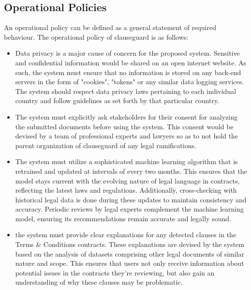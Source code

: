 \subsection{Operational Policies}
An operational policy can be defined as a general statement of required behaviour. The operational policy of clauseguard is as follows: 
\begin{itemize}
    \item Data privacy is a major cause of concern for the proposed system. Sensitive and confidential information would be shared on an open internet website. As such, the system must ensure that no information is stored on any back-end servers in the form of "cookies", "tokens" or any similar data logging services. The system should respect data privacy laws pertaining to each individual country and follow guidelines as set forth by that particular country. 
    
    \item The system must explicitly ask stakeholders for their consent for analyzing the submitted documents before using the system. This consent would be devised by a team of professional experts and lawyers so as to not hold the parent organization of clauseguard of any legal ramifications. 

    \item The system must utilize a sophisticated machine learning algorithm that is retrained and updated at intervals of every two months. This ensures that the model stays current with the evolving nature of legal language in contracts, reflecting the latest laws and regulations. Additionally, cross-checking with historical legal data is done during these updates to maintain consistency and accuracy. Periodic reviews by legal experts complement the machine learning model, ensuring its recommendations remain accurate and legally sound.

    \item the system must provide clear explanations for any detected clauses in the Terms & Conditions contracts. These explanations are devised by the system based on the analysis of datasets comprising other legal documents of similar nature and scope. This ensures that users not only receive information about potential issues in the contracts they're reviewing, but also gain an understanding of why these clauses may be problematic.
\end{itemize}

